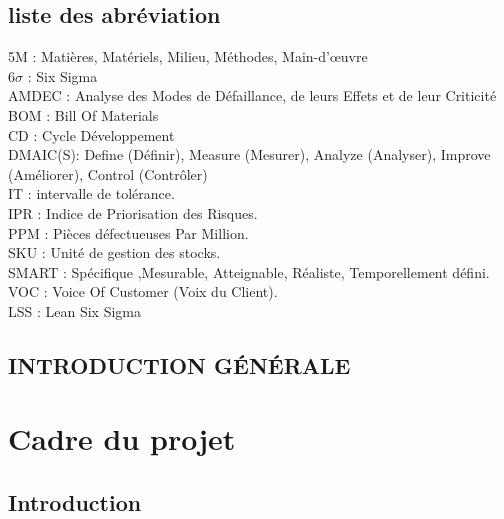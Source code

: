 \documentclass[12pt, a4paper]{thesis}
\begin{document}
\begin{center}
\chapter*{liste des abréviation}
\vspace{0.5cm}
\end{center}
 5M : Matières, Matériels, Milieu, Méthodes, Main-d'œuvre\\
 6$\sigma$ : Six Sigma\\
 AMDEC : Analyse des Modes de Défaillance, de leurs Effets et de leur Criticité\\
 BOM : Bill Of Materials\\
 CD : Cycle Développement\\
 DMAIC(S): Define (Définir), Measure (Mesurer), Analyze (Analyser), Improve (Améliorer), Control (Contrôler)\\
 IT : intervalle de tolérance. \\
 IPR : Indice de Priorisation des Risques.\\
 PPM : Pièces défectueuses Par Million. \\
 SKU : Unité de gestion des stocks.\\
 SMART : Spécifique ,Mesurable, Atteignable, Réaliste, Temporellement défini.\\
 VOC : Voice Of Customer (Voix du Client).\\
LSS : Lean Six Sigma\\
 




\thispagestyle{fancy}
\thispagestyle{fancy}
\newpage
\thispagestyle{fancy}
\setcounter{page}{1}



\newpage
\begin{center}
\section*{INTRODUCTION GÉNÉRALE}
\vspace{0.5cm}
\end{center}


\newpage
\chapter{Cadre du projet}
\lhead{\leftmark}
\section*{Introduction}
\end{document}
